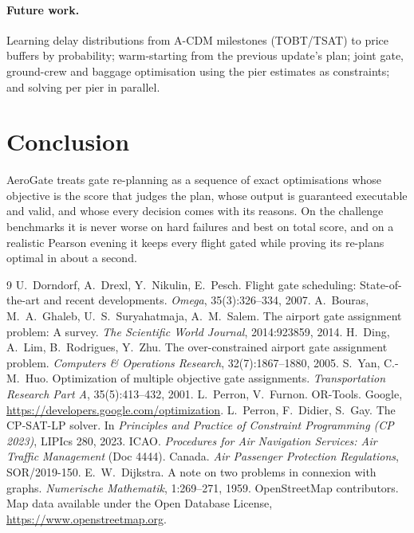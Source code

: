 \documentclass[11pt]{article}
\theoremstyle{remark}
\begin{document}
\paragraph{Future work.} Learning delay distributions from A-CDM milestones (TOBT/TSAT) to price
buffers by probability; warm-starting from the previous update's plan; joint gate, ground-crew and
baggage optimisation using the pier estimates as constraints; and solving per pier in parallel.

\section{Conclusion}
AeroGate treats gate re-planning as a sequence of exact optimisations whose objective is the score
that judges the plan, whose output is guaranteed executable and valid, and whose every decision comes
with its reasons. On the challenge benchmarks it is never worse on hard failures and best on total
score, and on a realistic Pearson evening it keeps every flight gated while proving its re-plans
optimal in about a second.

\begin{thebibliography}{9}
 U.~Dorndorf, A.~Drexl, Y.~Nikulin, E.~Pesch.
  Flight gate scheduling: State-of-the-art and recent developments.
  \emph{Omega}, 35(3):326--334, 2007.
 A.~Bouras, M.~A.~Ghaleb, U.~S.~Suryahatmaja, A.~M.~Salem.
  The airport gate assignment problem: A survey.
  \emph{The Scientific World Journal}, 2014:923859, 2014.
 H.~Ding, A.~Lim, B.~Rodrigues, Y.~Zhu.
  The over-constrained airport gate assignment problem.
  \emph{Computers \& Operations Research}, 32(7):1867--1880, 2005.
 S.~Yan, C.-M.~Huo.
  Optimization of multiple objective gate assignments.
  \emph{Transportation Research Part A}, 35(5):413--432, 2001.
 L.~Perron, V.~Furnon. OR-Tools. Google, \url{https://developers.google.com/optimization}.
 L.~Perron, F.~Didier, S.~Gay. The CP-SAT-LP solver.
  In \emph{Principles and Practice of Constraint Programming (CP 2023)}, LIPIcs 280, 2023.
 ICAO. \emph{Procedures for Air Navigation Services: Air Traffic Management} (Doc 4444).
 Canada. \emph{Air Passenger Protection Regulations}, SOR/2019-150.
 E.~W.~Dijkstra. A note on two problems in connexion with graphs.
  \emph{Numerische Mathematik}, 1:269--271, 1959.
 OpenStreetMap contributors. Map data available under the Open Database License,
  \url{https://www.openstreetmap.org}.
\end{thebibliography}
\end{document}
